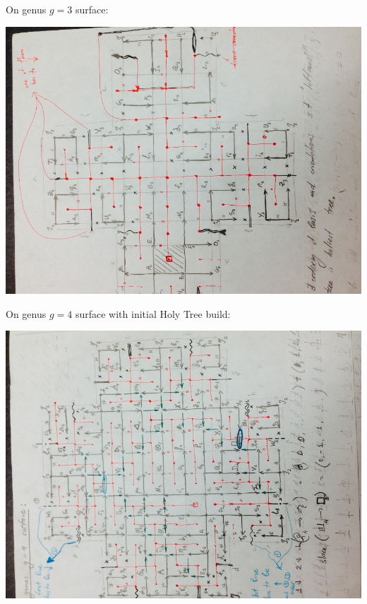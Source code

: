 \documentclass{article}
\begin{document}
On genus $g = 3$ surface:
\begin{center}
\includegraphics[angle = -90, scale = 0.7]{genus3.jpg}
\end{center}
\newpage

On genus $g = 4$ surface with initial Holy Tree build:
\begin{center}
\includegraphics[angle = -90, scale = 0.7]{Genus4_InitialHolyTree.jpg}
\end{center}
\newpage
\end{document}
